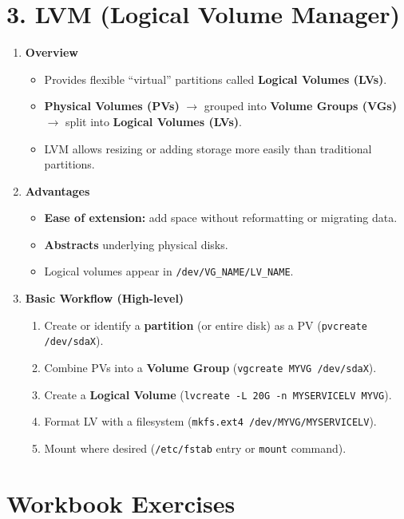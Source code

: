 \documentclass[a4paper]{report}
\begin{document}
\section*{3. LVM (Logical Volume Manager)}

\begin{enumerate}
    \item \textbf{Overview}
    \begin{itemize}
        \item Provides flexible “virtual” partitions called \textbf{Logical Volumes (LVs)}.
        \item \textbf{Physical Volumes (PVs)} $\to$ grouped into \textbf{Volume Groups (VGs)} $\to$ split into \textbf{Logical Volumes (LVs)}.
        \item LVM allows resizing or adding storage more easily than traditional partitions.
    \end{itemize}

    \item \textbf{Advantages}
    \begin{itemize}
        \item \textbf{Ease of extension:} add space without reformatting or migrating data.
        \item \textbf{Abstracts} underlying physical disks.
        \item Logical volumes appear in \texttt{/dev/VG\_NAME/LV\_NAME}.
    \end{itemize}

    \item \textbf{Basic Workflow (High-level)}
    \begin{enumerate}
        \item Create or identify a \textbf{partition} (or entire disk) as a PV (\texttt{pvcreate /dev/sdaX}).
        \item Combine PVs into a \textbf{Volume Group} (\texttt{vgcreate MYVG /dev/sdaX}).
        \item Create a \textbf{Logical Volume} (\texttt{lvcreate -L 20G -n MYSERVICELV MYVG}).
        \item Format LV with a filesystem (\texttt{mkfs.ext4 /dev/MYVG/MYSERVICELV}).
        \item Mount where desired (\texttt{/etc/fstab} entry or \texttt{mount} command).
    \end{enumerate}
\end{enumerate}

\section*{Workbook Exercises}
\end{document}
